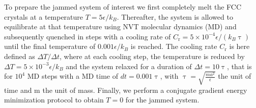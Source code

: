 \documentclass[%
preprint,
 amsmath,amssymb,
 aps,
]{revtex4-1}
\begin{document}
{{ To prepare the jammed system of interest we first completely melt the FCC crystals at a temperature $T=5 \epsilon/k_B$. Thereafter, the system is allowed to equilibrate at that temperature using NVT molecular dynamics (MD) and subsequently quenched in steps with a cooling rate of $C_{\text{r}} = 5 \times 10^{-4}
\epsilon/(k_B  \uptau)$ until the final temperature of $0.001 \epsilon/k_B$ is reached. The cooling rate $C_{\text{r}}$ is here defined as $\Delta T/\Delta t$, where at each cooling step, the temperature is reduced by $\Delta T = 5 \times 10^{-3} \epsilon/k_B$ and the system relaxed for a duration of $\Delta t = 10 \uptau$, that is for $10^4$ MD steps with a MD time of $dt = 0.001 \uptau$, with  $\uptau = \sqrt{\frac{ma^2}{\epsilon}}$ the unit of time and m the unit of mass. Finally, we perform a conjugate gradient energy minimization protocol to obtain $T=0$ for the jammed system. 
 
}}
\end{document}

